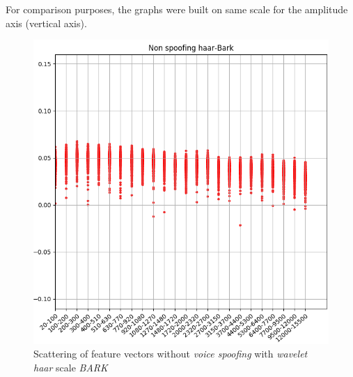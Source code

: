 		\par For comparison purposes, the graphs were built on same scale for the amplitude axis (vertical axis).
		
		\begin{figure}[H]
			\centering
			\includegraphics[scale=.55]{images/results/barkVersusMel/liveHaarBark}
			\caption{Scattering of feature vectors without \textit{voice spoofing} with \textit{wavelet haar} scale \textit {BARK}}
			\label{fig:livehaarbark}
		\end{figure}
		
